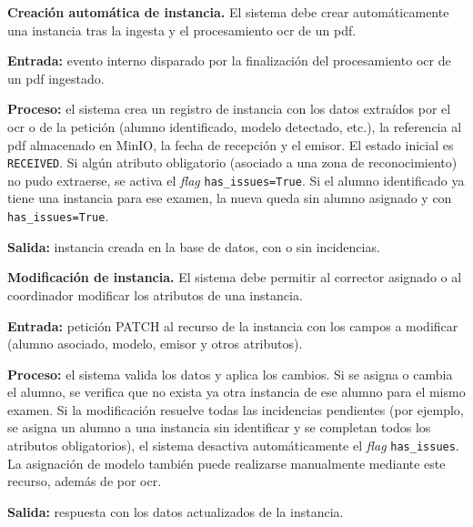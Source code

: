 \begin{functional}

    \item \textbf{Creación automática de instancia.} \label{rf:instances:create}
    El sistema debe crear automáticamente una instancia tras la ingesta y el procesamiento
    \acs{ocr} de un \acs{pdf}.

    \textbf{Entrada:} evento interno disparado por la finalización del procesamiento
    \acs{ocr} de un \acs{pdf} ingestado.

    \textbf{Proceso:} el sistema crea un registro de instancia con los datos extraídos por
    el \acs{ocr} o de la petición (alumno identificado, modelo detectado, etc.), la
    referencia al \acs{pdf} almacenado en MinIO, la fecha de recepción y el emisor. El
    estado inicial es \texttt{RECEIVED}. Si algún atributo obligatorio (asociado a una zona
    de reconocimiento) no pudo extraerse, se activa el \textit{flag}
    \texttt{has\_issues=True}. Si el alumno identificado ya tiene una instancia para ese
    examen, la nueva queda sin alumno asignado y con \texttt{has\_issues=True}.

    \textbf{Salida:} instancia creada en la base de datos, con o sin incidencias.

    \item \textbf{Modificación de instancia.} \label{rf:instances:update}
    El sistema debe permitir al corrector asignado o al coordinador modificar los atributos
    de una instancia.

    \textbf{Entrada:} petición PATCH al recurso de la instancia con los campos a modificar
    (alumno asociado, modelo, emisor y otros atributos).

    \textbf{Proceso:} el sistema valida los datos y aplica los cambios. Si se asigna o
    cambia el alumno, se verifica que no exista ya otra instancia de ese alumno para el
    mismo examen. Si la modificación resuelve todas las incidencias pendientes (por ejemplo,
    se asigna un alumno a una instancia sin identificar y se completan todos los atributos
    obligatorios), el sistema desactiva automáticamente el \textit{flag}
    \texttt{has\_issues}. La asignación de modelo también puede realizarse manualmente
    mediante este recurso, además de por \acs{ocr}.

    \textbf{Salida:} respuesta con los datos actualizados de la instancia.


\end{functional}
